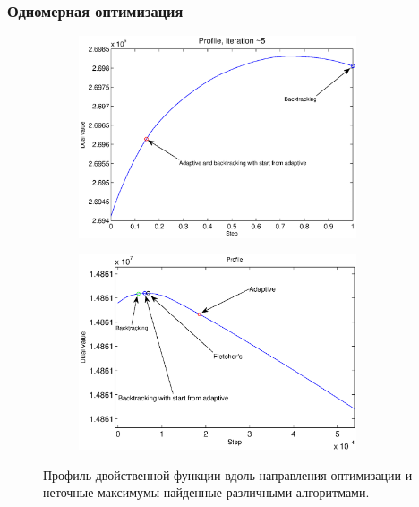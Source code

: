 \documentclass{article}
\begin{document}
\subsubsection{Одномерная оптимизация}
\begin{figure}
    \centering
    \begin{subfigure}[t]{\textwidth}
            \centering
            \includegraphics[width=0.9\textwidth]{profile_subgradient_tsukuba}
    \end{subfigure}
    \begin{subfigure}[t]{\textwidth}
            \centering
            \includegraphics[width=0.9\textwidth]{profile_subgradient_cones}
    \end{subfigure}
    \caption{Профиль двойственной функции вдоль направления оптимизации и неточные максимумы найденные различными алгоритмами.}
    \label{fig:profile}
\end{figure}
\end{document}
